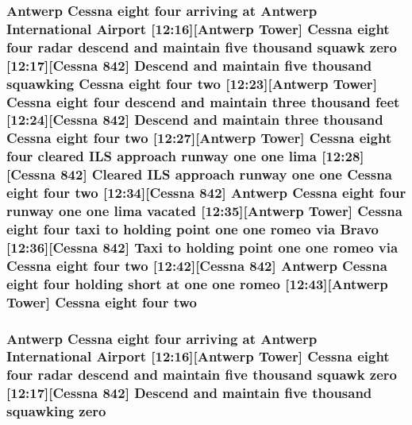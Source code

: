 \subsubsection[{\texorpdfstring{two}{two}}]{\setlength{\rightskip}{0pt plus 5cm}Antwerp {\bf Cessna} eight four arriving at Antwerp International {\bf Airport} \mbox{[}12\+:16\mbox{]}\mbox{[}Antwerp {\bf Tower}\mbox{]} {\bf Cessna} eight four radar descend and maintain five {\bf thousand} squawk {\bf zero} \mbox{[}12\+:17\mbox{]}\mbox{[}{\bf Cessna} 842\mbox{]} Descend and maintain five {\bf thousand} {\bf squawking} {\bf Cessna} eight four two \mbox{[}12\+:23\mbox{]}\mbox{[}Antwerp {\bf Tower}\mbox{]} {\bf Cessna} eight four descend and maintain three {\bf thousand} {\bf feet} \mbox{[}12\+:24\mbox{]}\mbox{[}{\bf Cessna} 842\mbox{]} Descend and maintain three {\bf thousand} {\bf Cessna} eight four two \mbox{[}12\+:27\mbox{]}\mbox{[}Antwerp {\bf Tower}\mbox{]} {\bf Cessna} eight four cleared I\+LS approach runway {\bf one} {\bf one} {\bf lima} \mbox{[}12\+:28\mbox{]}\mbox{[}{\bf Cessna} 842\mbox{]} Cleared I\+LS approach runway {\bf one} {\bf one} {\bf Cessna} eight four two \mbox{[}12\+:34\mbox{]}\mbox{[}{\bf Cessna} 842\mbox{]} Antwerp {\bf Cessna} eight four runway {\bf one} {\bf one} {\bf lima} vacated \mbox{[}12\+:35\mbox{]}\mbox{[}Antwerp {\bf Tower}\mbox{]} {\bf Cessna} eight four taxi to holding point {\bf one} {\bf one} {\bf romeo} via {\bf Bravo} \mbox{[}12\+:36\mbox{]}\mbox{[}{\bf Cessna} 842\mbox{]} Taxi to holding point {\bf one} {\bf one} {\bf romeo} via {\bf Cessna} eight four two \mbox{[}12\+:42\mbox{]}\mbox{[}{\bf Cessna} 842\mbox{]} Antwerp {\bf Cessna} eight four holding short at {\bf one} {\bf one} {\bf romeo} \mbox{[}12\+:43\mbox{]}\mbox{[}Antwerp {\bf Tower}\mbox{]} {\bf Cessna} eight four two}\hypertarget{happyDay2ExpectedATC_8txt_a8cad909be335793c9a2bc86d42edc8a5}{}\label{happyDay2ExpectedATC_8txt_a8cad909be335793c9a2bc86d42edc8a5}
\subsubsection[{\texorpdfstring{zero}{zero}}]{\setlength{\rightskip}{0pt plus 5cm}Antwerp {\bf Cessna} eight four arriving at Antwerp International {\bf Airport} \mbox{[}12\+:16\mbox{]}\mbox{[}Antwerp {\bf Tower}\mbox{]} {\bf Cessna} eight four radar descend and maintain five {\bf thousand} squawk zero \mbox{[}12\+:17\mbox{]}\mbox{[}{\bf Cessna} 842\mbox{]} Descend and maintain five {\bf thousand} {\bf squawking} zero}\hypertarget{happyDay2ExpectedATC_8txt_adce466d7618784129bcb0feb6d2d98e4}{}\label{happyDay2ExpectedATC_8txt_adce466d7618784129bcb0feb6d2d98e4}

